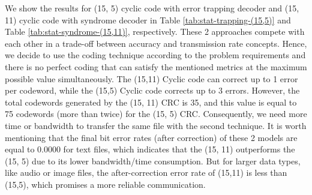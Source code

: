 \documentclass{article}
\begin{document}
We show the results for (15, 5) cyclic code with error trapping decoder and (15, 11) cyclic code with syndrome decoder in Table \ref{tab:stat-trapping-(15,5)} and Table \ref{tab:stat-syndrome-(15,11)}, respectively. These 2 approaches compete with each other in a trade-off between accuracy and transmission rate concepts. Hence, we decide to use the coding technique according to the problem requirements and there is no perfect coding that can satisfy the mentioned metrics at the maximum possible value simultaneously. The (15,11) Cyclic code can correct up to 1 error per codeword, while the (15,5) Cyclic code corrects up to 3 errors. However, the total codewords generated by the (15, 11) CRC is 35, and this value is equal to 75 codewords (more than twice) for the (15, 5) CRC. Consequently, we need more time or bandwidth to transfer the same file with the second technique. It is worth mentioning that the final bit error rates (after correction) of these 2 models are equal to 0.0000 for text files, which indicates that the (15, 11) outperforms the (15, 5) due to its lower bandwidth/time consumption. But for larger data types, like audio or image files, the after-correction error rate of  (15,11) is less than (15,5), which promises a more reliable communication.
\end{document}
